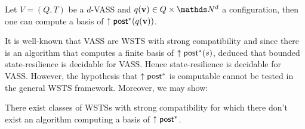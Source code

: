 \begin{proposition}
Let $V= (Q,T)$ be a $d$-VASS and $q(\textbf{v}) \in Q \times \N^d$ a configuration, then one can compute a basis of $\uparrow \textsf{post}^*(q(\textbf{v}))$.
\end{proposition}


\iffalse
\begin{proof}
By Proposition~\ref{post*}, a basis of $\uparrow \post^*(s)$ is computable for every state $s$ iff the downward-reachability problem is decidable.
Let us now show that the downward-reachability problem is decidable for Petri nets.
Let us consider a downward closed set $D$ in a Petri net.
Let us consider $B$ a basis of the upward-closed set $S \setminus D$.

$D$ is  defined by ... states where your number of counter is bounded by a constant (deduce this from ... having to be smaller than elements of the basis $B$), and others where it is unbounded. You have $m$ counters where it is bounded by $n$
then you have $m \times n$ possibilities for the values in these counters
you have unlimited possibilities for the values of the other counters,
but that is where the submarking problem comes in handy,
i.e. you ask the submarking problem for all of the $m \times n$ possibilities.

So downward-set reachability is decidable for PN.
\end{proof}
\fi

It is well-known that 
VASS are WSTS with strong compatibility and since there is an algorithm that computes a finite basis of  $\uparrow \post^*(s)$, \cite{DBLP:conf/gg/Ozkan22} deduced that bounded state-resilience is decidable for VASS.
Hence state-resilience is decidable for %
VASS.
However, the hypothesis that $\uparrow \textsf{post}^*$ is computable cannot be tested in the general WSTS framework. Moreover, we may show:

\begin{proposition}
There exist classes of WSTSs with strong 
 compatibility for which there don't exist an algorithm computing a basis of $\uparrow \textsf{post}^*$.
\end{proposition}


